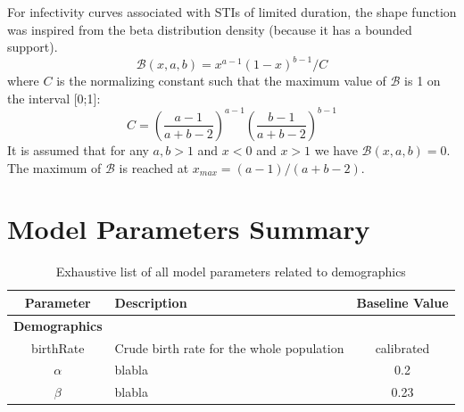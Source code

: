 \documentclass[11pt, onecolumn]{article}
\begin{document}
For infectivity curves associated with STIs of limited duration, the shape function was inspired from the beta distribution density (because it has a bounded support).
$$\mathcal{B}(x,a,b) = x^{a-1}(1-x)^{b-1}/C$$
where $C$ is the normalizing constant such that the maximum value of $\mathcal{B}$ is 1 on the interval [0;1]:
$$C=\left(\frac{a-1}{a+b-2}\right)^{a-1}\left(\frac{b-1}{a+b-2}\right)^{b-1}$$
It is assumed that for any $a,b>1$ and  $x<0$ and $x>1$ we have $\mathcal{B}(x,a,b)=0$.
The maximum of $\mathcal{B}$ is reached at $x_{max}=(a-1)/(a+b-2)$.


\newpage



\section{Model Parameters Summary}



\begin{table}[htdp]

\begin{footnotesize}
\begin{center}
\begin{tabular}{|clc|}
\hline
\textbf{Parameter}  & \textbf{Description} & \textbf{Baseline Value}\\
\hline

\textbf{Demographics} & & \\
 birthRate & Crude birth rate for the whole population & calibrated\\
$\alpha$  & blabla & 0.2 \\
$\beta$  & blabla & 0.23 \\
\hline
\end{tabular}
\caption{Exhaustive list of all model parameters related to demographics}
\label{tab:demogAllParam}
\end{center}
\end{footnotesize}
\end{table}


\end{document}
